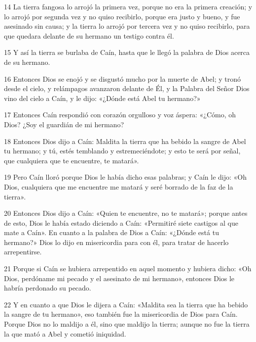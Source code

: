 \par 14 La tierra fangosa lo arrojó la primera vez, porque no era la primera creación; y lo arrojó por segunda vez y no quiso recibirlo, porque era justo y bueno, y fue asesinado sin causa; y la tierra lo arrojó por tercera vez y no quiso recibirlo, para que quedara delante de su hermano un testigo contra él.

\par 15 Y así la tierra se burlaba de Caín, hasta que le llegó la palabra de Dios acerca de su hermano.

\par 16 Entonces Dios se enojó y se disgustó mucho por la muerte de Abel; y tronó desde el cielo, y relámpagos avanzaron delante de Él, y la Palabra del Señor Dios vino del cielo a Caín, y le dijo: «¿Dónde está Abel tu hermano?»

\par 17 Entonces Caín respondió con corazón orgulloso y voz áspera: «¿Cómo, oh Dios? ¿Soy el guardián de mi hermano?

\par 18 Entonces Dios dijo a Caín: Maldita la tierra que ha bebido la sangre de Abel tu hermano; y tú, estés temblando y estremeciéndote; y esto te será por señal, que cualquiera que te encuentre, te matará».

\par 19 Pero Caín lloró porque Dios le había dicho esas palabras; y Caín le dijo: «Oh Dios, cualquiera que me encuentre me matará y seré borrado de la faz de la tierra».

\par 20 Entonces Dios dijo a Caín: «Quien te encuentre, no te matará»; porque antes de esto, Dios le había estado diciendo a Caín: «Permitiré siete castigos al que mate a Caín». En cuanto a la palabra de Dios a Caín: «¿Dónde está tu hermano?» Dios lo dijo en misericordia para con él, para tratar de hacerlo arrepentirse.

\par 21 Porque si Caín se hubiera arrepentido en aquel momento y hubiera dicho: «Oh Dios, perdóname mi pecado y el asesinato de mi hermano», entonces Dios le habría perdonado su pecado.

\par 22 Y en cuanto a que Dios le dijera a Caín: «Maldita sea la tierra que ha bebido la sangre de tu hermano», eso también fue la misericordia de Dios para Caín. Porque Dios no lo maldijo a él, sino que maldijo la tierra; aunque no fue la tierra la que mató a Abel y cometió iniquidad.

